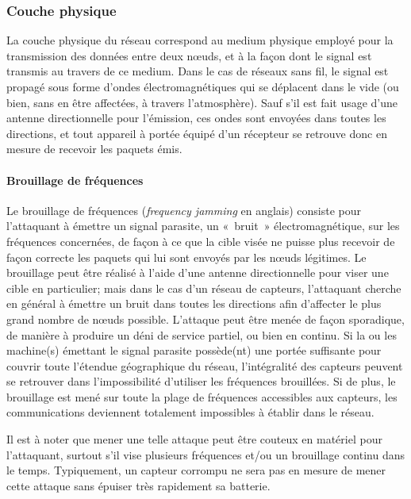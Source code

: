     \subsubsection{Couche physique}
La couche physique du réseau correspond au medium physique employé pour la transmission des données entre deux nœuds, et à la façon dont le signal est transmis au travers de ce medium.
Dans le cas de réseaux sans fil, le signal est propagé sous forme d'ondes électromagnétiques qui se déplacent dans le vide (ou bien, sans en être affectées, à travers l'atmosphère).
Sauf s'il est fait usage d'une antenne directionnelle pour l'émission, ces ondes sont envoyées dans toutes les directions, et tout appareil à portée équipé d'un récepteur se retrouve donc en mesure de recevoir les paquets émis.

        \paragraph{Brouillage de fréquences}
Le brouillage de fréquences (\textit{frequency jamming} en anglais) consiste pour l'attaquant à émettre un signal parasite, un « bruit » électromagnétique, sur les fréquences concernées, de façon à ce que la cible visée ne puisse plus recevoir de façon correcte les paquets qui lui sont envoyés par les nœuds légitimes.
Le brouillage peut être réalisé à l'aide d'une antenne directionnelle pour viser une cible en particulier; mais dans le cas d'un réseau de capteurs, l'attaquant cherche en général à émettre un bruit dans toutes les directions afin d'affecter le plus grand nombre de nœuds possible.
L'attaque peut être menée de façon sporadique, de manière à produire un déni de service partiel, ou bien en continu.
Si la ou les machine(s) émettant le signal parasite possède(nt) une portée suffisante pour couvrir toute l'étendue géographique du réseau, l'intégralité des capteurs peuvent se retrouver dans l'impossibilité d'utiliser les fréquences brouillées.
Si de plus, le brouillage est mené sur toute la plage de fréquences accessibles aux capteurs, les communications deviennent totalement impossibles à établir dans le réseau.

Il est à noter que mener une telle attaque peut être couteux en matériel pour l'attaquant, surtout s'il vise plusieurs fréquences et/ou un brouillage continu dans le temps.
Typiquement, un capteur corrompu ne sera pas en mesure de mener cette attaque sans épuiser très rapidement sa batterie.

